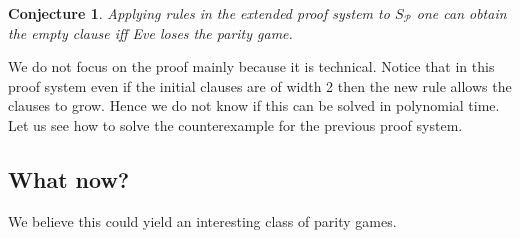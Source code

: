 \documentclass[a4paper,10pt]{article}
\newtheorem{conjecture}{Conjecture}
\begin{document}
\begin{conjecture}
Applying rules in the extended proof system to $S_{\mathcal{P}}$ one can obtain the empty clause iff Eve loses the parity game.
\end{conjecture}
We do not focus on the proof mainly because it is technical. Notice that in this proof system even if the initial clauses are of width 2 then the new rule allows the clauses to grow. Hence we do not know if this can be solved in polynomial time. Let us see how to solve the counterexample for the previous proof system.

\begin{prooftree}
\end{prooftree}

\subsection{What now?}
We believe this could yield an interesting class of parity games.
\end{document}
